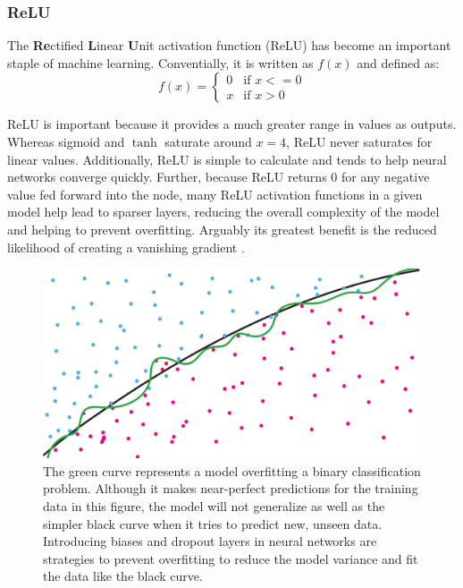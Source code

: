 \subsubsection{ReLU}
The \textbf{Re}ctified \textbf{L}inear \textbf{U}nit activation function (ReLU) has become an important staple of machine learning. Conventially, it is written as $ f(x) $ and defined as:
\begin{equation}
f(x)=
\begin{cases}
    0 & \text{if } x <= 0 \\
    x & \text{if } x > 0
\end{cases}
\end{equation}

\noindent ReLU is important because it provides a much greater range in values as outputs. Whereas sigmoid and $\tanh$ saturate around ${x=4}$, ReLU never saturates for linear values. Additionally, ReLU is simple to calculate and tends to help neural networks converge quickly. Further, because ReLU returns 0 for any negative value fed forward into the node, many ReLU activation functions in a given model help lead to sparser layers, reducing the overall complexity of the model and helping to prevent overfitting. Arguably its greatest benefit is the reduced likelihood of creating a vanishing gradient \cite{orig-relu}. 


\begin{figure}[h]
    \centering
    \includegraphics[width=\linewidth]{Chapters/Figures/overfittingOrig2.pdf}
    \caption[Overfitting]{The green curve represents a model overfitting a binary classification problem. Although it makes near-perfect predictions for the training data in this figure, the model will not generalize as well as the simpler black curve when it tries to predict new, unseen data. Introducing biases and dropout layers in neural networks are strategies to prevent overfitting to reduce the model variance and fit the data like the black curve.}
    \label{fig:overfitting}
\end{figure}


